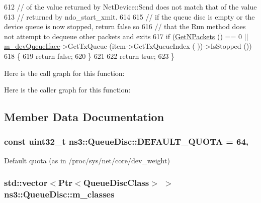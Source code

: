 \begin{DoxyCode}
612   \textcolor{comment}{// of the value returned by NetDevice::Send does not match that of the value}
613   \textcolor{comment}{// returned by ndo\_start\_xmit.}
614 
615   \textcolor{comment}{// if the queue disc is empty or the device queue is now stopped, return false so}
616   \textcolor{comment}{// that the Run method does not attempt to dequeue other packets and exits}
617   \textcolor{keywordflow}{if} (\hyperlink{classns3_1_1QueueDisc_a6ee992f32c1671512f0948fd6cc46a7e}{GetNPackets} () == 0 || \hyperlink{classns3_1_1QueueDisc_a265febf26e8325dbb3ba1f905ea1912d}{m\_devQueueIface}->GetTxQueue (item->GetTxQueueIndex (
      ))->IsStopped ())
618     \{
619       \textcolor{keywordflow}{return} \textcolor{keyword}{false};
620     \}
621 
622   \textcolor{keywordflow}{return} \textcolor{keyword}{true};
623 \}
\end{DoxyCode}


Here is the call graph for this function\+:




Here is the caller graph for this function\+:




\subsection{Member Data Documentation}
\subsubsection[{\texorpdfstring{D\+E\+F\+A\+U\+L\+T\+\_\+\+Q\+U\+O\+TA}{DEFAULT_QUOTA}}]{\setlength{\rightskip}{0pt plus 5cm}const uint32\+\_\+t ns3\+::\+Queue\+Disc\+::\+D\+E\+F\+A\+U\+L\+T\+\_\+\+Q\+U\+O\+TA = 64\hspace{0.3cm}{\ttfamily [static]}, {\ttfamily [private]}}\hypertarget{classns3_1_1QueueDisc_a057a2c6dd982ffb206ce2a42eb4f46fa}{}\label{classns3_1_1QueueDisc_a057a2c6dd982ffb206ce2a42eb4f46fa}


Default quota (as in /proc/sys/net/core/dev\+\_\+weight) 

\subsubsection[{\texorpdfstring{m\+\_\+classes}{m_classes}}]{\setlength{\rightskip}{0pt plus 5cm}std\+::vector$<${\bf Ptr}$<${\bf Queue\+Disc\+Class}$>$ $>$ ns3\+::\+Queue\+Disc\+::m\+\_\+classes\hspace{0.3cm}{\ttfamily [private]}}\hypertarget{classns3_1_1QueueDisc_a054d624a7a6f10a11cffec1f858feb3c}{}\label{classns3_1_1QueueDisc_a054d624a7a6f10a11cffec1f858feb3c}


